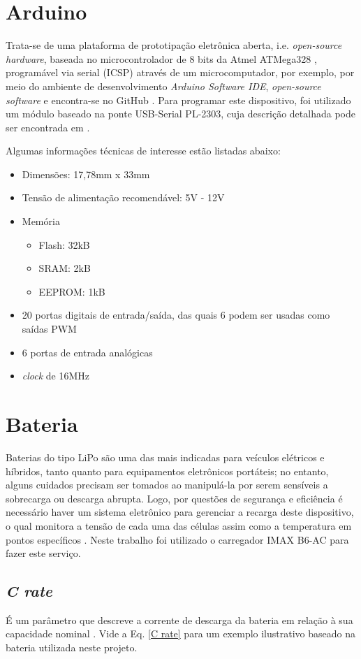 \section{Arduino}
Trata-se de uma plataforma de prototipação eletrônica aberta, i.e. \textit{open-source hardware}, baseada no microcontrolador de 8 bits da Atmel 
ATMega328 \cite{ATMega}, programável via serial (ICSP) através de um microcomputador, por exemplo, por meio do ambiente de desenvolvimento 
\textit{Arduino Software IDE}, \textit{open-source software} e encontra-se no GitHub \cite{ArduSoft}.
Para programar este dispositivo, foi utilizado um módulo baseado na ponte USB-Serial PL-2303, cuja descrição detalhada pode ser encontrada em 
\cite{PL2303}.

Algumas informações técnicas \cite{ArduInfo} de interesse estão listadas abaixo: 
\begin{itemize}
 \item Dimensões: 17,78mm x 33mm
 \item Tensão de alimentação recomendável: 5V - 12V
 \item Memória 
 \begin{itemize}
  \item Flash: 32kB 
  \item SRAM: 2kB
  \item EEPROM: 1kB
 \end{itemize}

 \item 20 portas digitais de entrada/saída, das quais 6 podem ser usadas como saídas PWM
 \item 6 portas de entrada analógicas
 \item \textit{clock} de 16MHz
\end{itemize}


\section{Bateria} %
Baterias do tipo LiPo são uma das mais indicadas para veículos elétricos e híbridos, tanto quanto para equipamentos eletrônicos portáteis; no 
entanto, alguns cuidados precisam ser tomados ao manipulá-la por serem sensíveis a sobrecarga ou descarga abrupta.
Logo, por questões de segurança e eficiência é necessário haver um sistema eletrônico para gerenciar a recarga deste dispositivo, o qual monitora a 
tensão de cada uma das células assim como a temperatura em pontos específicos \cite{battery}.
Neste trabalho foi utilizado o carregador IMAX B6-AC para fazer este serviço.
\subsection{\textit{C rate}}
É um parâmetro que descreve a corrente de descarga da bateria em relação à sua capacidade nominal \cite{bateria}.
Vide a Eq. \ref{C rate} para um exemplo ilustrativo baseado na bateria utilizada neste projeto.

